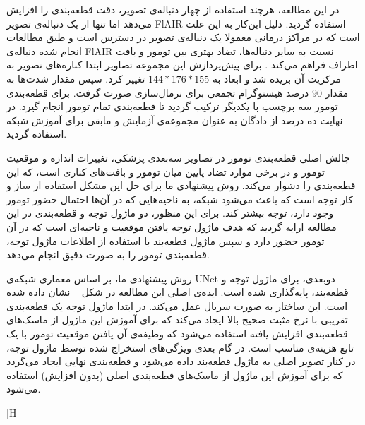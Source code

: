 در این مطالعه، هرچند استفاده از چهار دنباله‌ی تصویر، دقت قطعه‌بندی را افزایش می‌دهد اما تنها از یک دنباله‌ی تصویر FlAIR استفاده گردید. دلیل این‌کار به این علت است که در مراکز درمانی معمولا یک دنباله‌ی تصویر در دسترس است و طبق مطالعات انجام شده دنباله‌ی FlAIR نسبت به سایر دنباله‌ها، تضاد بهتری بین تومور و بافت اطراف فراهم می‌کند . برای پیش‌پردازش این مجموعه تصاویر ابتدا کناره‌های تصویر به مرکزیت آن بریده شد و ابعاد به $144*176*155$ تغییر کرد. سپس مقدار شدت‌ها به مقدار 90 درصد هیستوگرام تجمعی برای نرمال‌سازی صورت گرفت. برای قطعه‌بندی تومور سه برچسب با یکدیگر ترکیب گردید تا قطعه‌بندی تمام تومور انجام گیرد. در نهایت ده درصد از دادگان به عنوان مجموعه‌ی آزمایش و مابقی برای آموزش شبکه‌ استفاده گردید.


چالش اصلی قطعه‌بندی تومور در تصاویر سه‌بعدی پزشکی، تغییرات اندازه و موقعیت تومور و در برخی موارد تضاد پایین میان تومور و بافت‌های کناری است، که این قطعه‌بندی را دشوار می‌کند. روش پیشنهادی ما برای حل این مشکل استفاده از ساز و کار توجه است که باعث می‌شود شبکه، به ناحیه‌هایی که در آن‌ها احتمال حضور تومور وجود دارد، توجه بیشتر کند. برای این منظور، دو ماژول توجه و قطعه‌بندی در این مطالعه‌ ارایه گردید که هدف ماژول توجه یافتن موقعیت و ناحیه‌ای است که در آن تومور حضور دارد و سپس ماژول قطعه‌بند با استفاده از اطلاعات ماژول توجه، قطعه‌بندی تومور را به صورت دقیق انجام می‌دهد. 

روش پیشنهادی ما، بر اساس معماری شبکه‌ی UNet دوبعدی، برای ماژول توجه و قطعه‌بند، پایه‌گذاری شده است. ایده‌ی اصلی این مطالعه در شکل ~ نشان داده شده است. این ساختار به صورت سریال عمل می‌کند. در ابتدا ماژول توجه یک قطعه‌بندی تقریبی با نرخ مثبت صحیح بالا ایجاد می‌کند که برای آموزش این ماژول از ماسک‌های قطعه‌بندی افزایش  یافته استفاده می‌شود که وظیفه‌ی آن یافتن موقعیت تومور با یک تابع هزینه‌ی مناسب است. در گام بعدی ویژگی‌های استخراج شده توسط ماژول توجه، در کنار تصویر اصلی به ماژول قطعه‌بند داده می‌شود و قطعه‌بندی نهایی ایجاد می‌گردد که برای آموزش این ماژول از ماسک‌های قطعه‌بندی اصلی (بدون افزایش) استفاده می‌شود.

[H]


